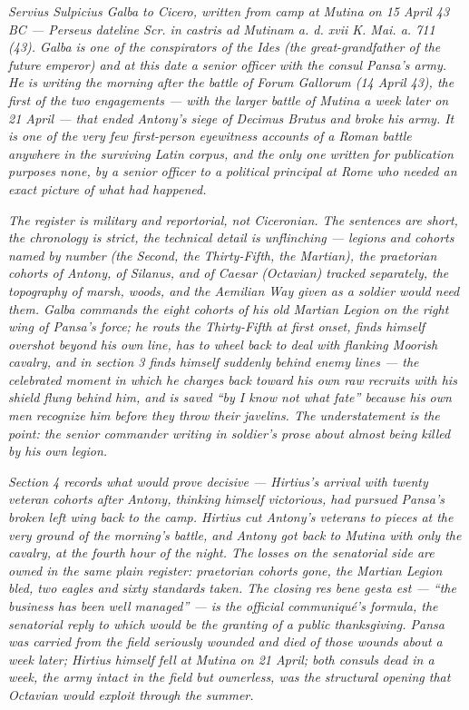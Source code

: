 
\textit{Servius Sulpicius Galba to Cicero, written from camp
at Mutina on 15 April 43 BC --- Perseus dateline \textit{Scr.
in castris ad Mutinam a. d. xvii K. Mai. a. 711 (43)}. Galba
is one of the conspirators of the Ides (the great-grandfather
of the future emperor) and at this date a senior officer with
the consul Pansa's army. He is writing the morning after the
battle of Forum Gallorum (14 April 43), the first of the two
engagements --- with the larger battle of Mutina a week later
on 21 April --- that ended Antony's siege of Decimus Brutus
and broke his army. It is one of the very few first-person
eyewitness accounts of a Roman battle anywhere in the
surviving Latin corpus, and the only one written for
publication purposes none, by a senior officer to a
political principal at Rome who needed an exact picture of
what had happened.}

\textit{The register is military and reportorial, not
Ciceronian. The sentences are short, the chronology is
strict, the technical detail is unflinching --- legions and
cohorts named by number (the Second, the Thirty-Fifth, the
Martian), the praetorian cohorts of Antony, of Silanus, and
of Caesar (Octavian) tracked separately, the topography of
marsh, woods, and the Aemilian Way given as a soldier would
need them. Galba commands the eight cohorts of his old
Martian Legion on the right wing of Pansa's force; he routs
the Thirty-Fifth at first onset, finds himself overshot
beyond his own line, has to wheel back to deal with
flanking Moorish cavalry, and in section 3 finds himself
suddenly behind enemy lines --- the celebrated moment in
which he charges back toward his own raw recruits with his
shield flung behind him, and is saved ``by I know not what
fate'' because his own men recognize him before they throw
their javelins. The understatement is the point: the senior
commander writing in soldier's prose about almost being
killed by his own legion.}

\textit{Section 4 records what would prove decisive ---
Hirtius's arrival with twenty veteran cohorts after Antony,
thinking himself victorious, had pursued Pansa's broken left
wing back to the camp. Hirtius cut Antony's veterans to
pieces at the very ground of the morning's battle, and Antony
got back to Mutina with only the cavalry, at the fourth hour
of the night. The losses on the senatorial side are owned in
the same plain register: praetorian cohorts gone, the
Martian Legion bled, two eagles and sixty standards taken.
The closing \textit{res bene gesta est} --- ``the business
has been well managed'' --- is the official communiqué's
formula, the senatorial reply to which would be the granting
of a public thanksgiving. Pansa was carried from the field
seriously wounded and died of those wounds about a week
later; Hirtius himself fell at Mutina on 21 April; both
consuls dead in a week, the army intact in the field but
ownerless, was the structural opening that Octavian would
exploit through the summer.}
